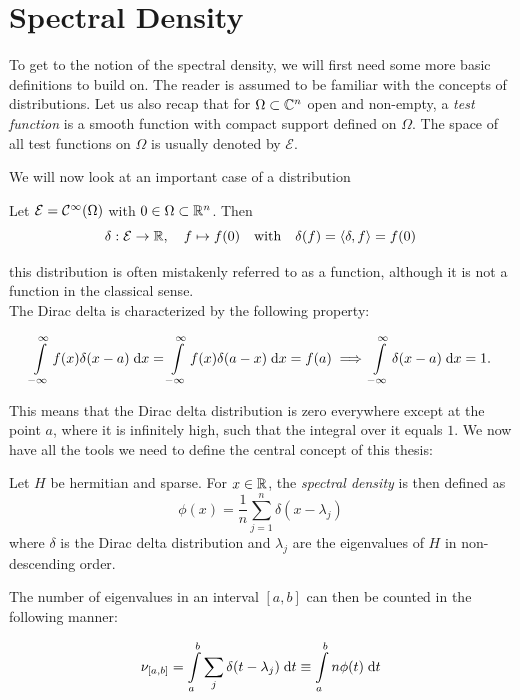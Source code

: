 \section{Spectral Density}

To get to the notion of the spectral density,
we will first need some more basic definitions to build on.
The reader is assumed to be familiar with the concepts of distributions.
Let us also recap that for $\Omega \subset \mathbb{C}^n$ open and non-empty,
a \emph{test function} is a smooth function with compact support defined on $\Omega$.
The space of all test functions on $\Omega$ is usually denoted by $\mathcal{E}$.

We will now look at an important case of a distribution

\begin{definition}
    Let $\mathcal{E} = \mathcal{C}^{\infty}(\Omega)$ with $0 \in \Omega \subset \mathbb{R}^n$.
    Then
    $$\delta: \mathcal{E} \to \mathbb{R}, \quad f \mapsto f(0) \quad \text{with} \quad \delta(f) = \langle \delta, f \rangle = f(0)$$
\end{definition}

this distribution is often mistakenly referred to as a function,
although it is not a function in the classical sense.\\
The Dirac delta is characterized by the following property:

\[
\int\limits_{-\infty}^{\infty} f(x) \delta(x-a) \;\mathrm{d}x = \int\limits_{-\infty}^{\infty} f(x) \delta(a-x) \;\mathrm{d}x = f(a) \implies \int\limits_{-\infty}^{\infty} \delta(x-a) \;\mathrm{d}x = 1.
\]

This means that the Dirac delta distribution is zero everywhere except at the point $a$,
where it is infinitely high, such that the integral over it equals $1$.
We now have all the tools we need to define the central concept of this thesis:

\begin{definition}
    Let $H$ be hermitian and sparse.
    For $x \in \mathbb{R}$, the \emph{spectral density} is then defined as
    \[
    \phi(x) = \frac{1}{n} \sum_{j=1}^{n} \delta(x - \lambda_j)
    \]
    where $\delta$ is the Dirac delta distribution
    and $\lambda_j$ are the eigenvalues of $H$ in non-descending order.
\end{definition}

The number of eigenvalues in an interval $[a, b]$ can then be counted in the following manner:

\begin{equation} \label{eq:nu_a_b}
    \nu_{[a, b]} = \int\limits_a^b \sum_j \delta(t - \lambda_j) \;\mathrm{d}t \equiv \int\limits_a^b n \phi(t) \;\mathrm{d}t
\end{equation}

